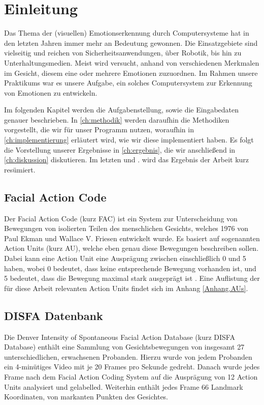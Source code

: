 \chapter{Einleitung}
\label{ch:einleitung}

Das Thema der (visuellen) Emotionserkennung durch Computersysteme hat in den letzten Jahren immer mehr an Bedeutung gewonnen.
Die Einsatzgebiete sind vielseitig und reichen von Sicherheitsanwendungen, über Robotik, bis hin zu Unterhaltungsmedien.
Meist wird versucht, anhand von verschiedenen Merkmalen im Gesicht, diesem eine oder mehrere Emotionen zuzuordnen. Im Rahmen
unsere Praktikums war es unsere Aufgabe, ein solches Computersystem zur Erkennung von Emotionen zu entwickeln.

Im folgenden Kapitel werden die Aufgabenstellung, sowie die Eingabedaten genauer beschrieben.
In \cref{ch:methodik} werden daraufhin die Methodiken vorgestellt, die wir für unser Programm nutzen, woraufhin in \cref{ch:implementierung} erläutert wird,
wie wir diese implementiert haben. Es folgt die Vorstellung unserer
Ergebnisse in \cref{ch:ergebnis}, die wir anschließend in \cref{ch:diskussion}
diskutieren. Im letzten und .  wird das Ergebnis der Arbeit kurz resümiert.

\section{Facial Action Code}
Der Facial Action Code (kurz FAC) ist ein System zur Unterscheidung von Bewegungen von isolierten Teilen des menschlichen Gesichts, welches
1976 von Paul Ekman und Wallace V. Friesen entwickelt wurde. Es basiert auf sogenannten Action Units (kurz AU), welche eben genau diese Bewegungen
beschreiben sollen. Dabei kann eine Action Unit eine Ausprägung zwischen einschließlich 0 und 5 haben, wobei 0 bedeutet, dass keine entsprechende
Bewegung vorhanden ist, und 5 bedeutet, dass die Bewegung maximal stark ausgeprägt ist \cite{ekman}. Eine Auflistung der für diese Arbeit relevanten Action Units
findet sich im Anhang \ref{Anhang.AUs}.

\section{DISFA Datenbank}
Die Denver Intensity of Spontaneous Facial Action Database (kurz DISFA Database) enthält eine Sammlung von Gesichtsbewegungen von insgesamt
27 unterschiedlichen, erwachsenen Probanden. Hierzu wurde von jedem Probanden ein 4-minütiges Video mit je 20 Frames pro Sekunde gedreht.
Danach wurde jedes Frame nach dem Facial Action Coding System auf die Ausprägung von 12 Action Units analysiert und gelabelled.\newline
Weiterhin enthält jedes Frame 66 Landmark Koordinaten, von markanten Punkten des Gesichtes.

